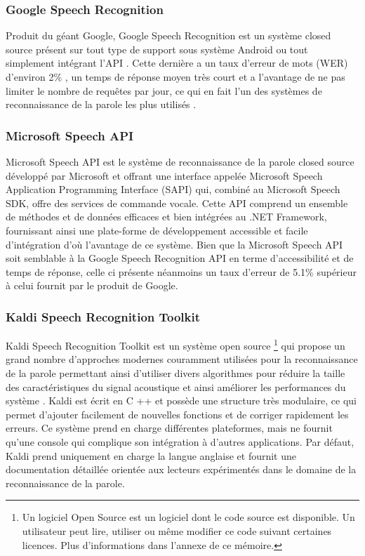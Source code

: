 \subsubsection{Google Speech Recognition}
Produit du géant Google, Google Speech Recognition est un système closed source présent sur tout type de support sous système Android ou tout simplement intégrant l'API \cite{googleapi}. Cette dernière a un taux d'erreur de mots (WER) d'environ 2\% \cite{googleapiwer}, un temps de réponse moyen très court et a l'avantage de ne pas limiter le nombre de requêtes par jour, ce qui en fait l'un des systèmes de reconnaissance de la parole les plus utilisés \cite{asrreview}.

\subsubsection{Microsoft Speech API}
Microsoft Speech API est le système de reconnaissance de la parole closed source développé par Microsoft \cite{microsoftapi} et offrant une interface appelée Microsoft Speech Application Programming Interface (SAPI) qui, combiné au Microsoft Speech SDK, offre des services de commande vocale. Cette API comprend un ensemble de méthodes et de données efficaces et bien intégrées au .NET Framework, fournissant ainsi une plate-forme de développement accessible et facile d'intégration d'où l'avantage de ce système. Bien que la Microsoft Speech API soit semblable à la Google Speech Recognition API en terme d'accessibilité et de temps de réponse, celle ci présente néanmoins un taux d'erreur de 5.1\% \cite{msapiwer} supérieur à celui fournit par le produit de Google. 

\subsubsection{Kaldi Speech Recognition Toolkit}
Kaldi Speech Recognition Toolkit est un système open source \footnote{Un logiciel Open Source est un logiciel dont le code source est disponible. Un utilisateur peut lire, utiliser ou même modifier ce code suivant certaines licences. Plus d'informations dans l'annexe de ce mémoire.} qui propose un grand nombre d'approches modernes couramment utilisées pour la reconnaissance de la parole permettant ainsi d'utiliser divers algorithmes pour réduire la taille des caractéristiques du signal acoustique et ainsi améliorer les performances du système \cite{kalidiapi}. Kaldi est écrit en C ++ et possède une structure très modulaire, ce qui permet d'ajouter facilement de nouvelles fonctions et de corriger rapidement les erreurs. Ce système prend en charge différentes plateformes, mais ne fournit qu'une console qui complique son intégration à d'autres applications. Par défaut, Kaldi prend uniquement en charge la langue anglaise et fournit une documentation détaillée orientée aux lecteurs expérimentés dans le domaine de la reconnaissance de la parole.

